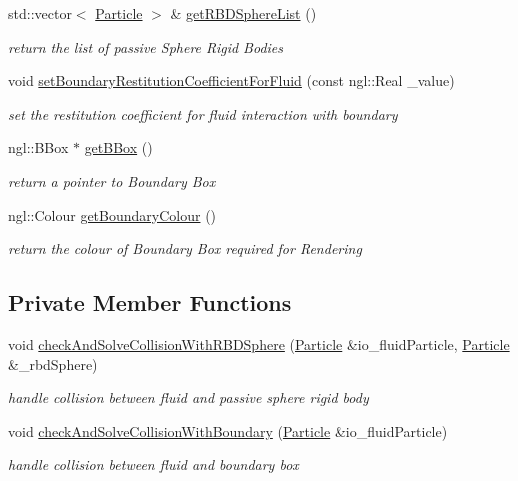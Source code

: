 \begin{DoxyCompactItemize}
std::vector$<$ \hyperlink{class_particle}{Particle} $>$ \& \hyperlink{class_environment_and_rigid_body_ab8f19c02935c0763d700dadf8ff4c097}{getRBDSphereList} ()
\begin{DoxyCompactList}\small\item\em return the list of passive Sphere Rigid Bodies \item\end{DoxyCompactList}\item 
void \hyperlink{class_environment_and_rigid_body_a1dd9536fc21a143341c904bc08f49f2b}{setBoundaryRestitutionCoefficientForFluid} (const ngl::Real \_\-value)
\begin{DoxyCompactList}\small\item\em set the restitution coefficient for fluid interaction with boundary \item\end{DoxyCompactList}\item 
ngl::BBox $\ast$ \hyperlink{class_environment_and_rigid_body_a9f816e09b8e10a8b90eca8c844c103b5}{getBBox} ()
\begin{DoxyCompactList}\small\item\em return a pointer to Boundary Box \item\end{DoxyCompactList}\item 
ngl::Colour \hyperlink{class_environment_and_rigid_body_a8ca2c863d79b81cc83b2be0529de0a96}{getBoundaryColour} ()
\begin{DoxyCompactList}\small\item\em return the colour of Boundary Box required for Rendering \item\end{DoxyCompactList}\end{DoxyCompactItemize}
\subsection*{Private Member Functions}
\begin{DoxyCompactItemize}
\item 
void \hyperlink{class_environment_and_rigid_body_acfad78cb6ae8ab9d7fb04479c98a618e}{checkAndSolveCollisionWithRBDSphere} (\hyperlink{class_particle}{Particle} \&io\_\-fluidParticle, \hyperlink{class_particle}{Particle} \&\_\-rbdSphere)
\begin{DoxyCompactList}\small\item\em handle collision between fluid and passive sphere rigid body \item\end{DoxyCompactList}\item 
void \hyperlink{class_environment_and_rigid_body_ad2f2263fff1ed7f94bb920b7970bdfa3}{checkAndSolveCollisionWithBoundary} (\hyperlink{class_particle}{Particle} \&io\_\-fluidParticle)
\begin{DoxyCompactList}\small\item\em handle collision between fluid and boundary box \item\end{DoxyCompactList}\end{DoxyCompactItemize}
